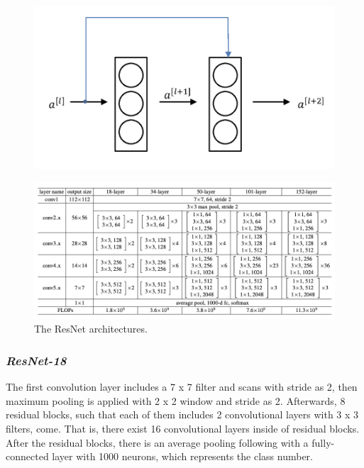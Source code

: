 \begin{figure}[h]
	\centering
	\includegraphics[width=.6\linewidth]{fig/residual_block.png}
	\label{fig:residual_block}
\end{figure}

\begin{figure}[h]
	\centering
	\includegraphics[width=\linewidth]{fig/resnet_archs.png}
	\vspace*{1mm}
	\caption{The ResNet architectures\cite{ResNet}.}
	\label{fig:resnet_archs}
\end{figure}

\subsubsection*{\textit{ResNet-18}}

The first convolution layer includes a 7 x 7 filter and scans with stride as 2, then maximum pooling is applied with 2 x 2 window and stride as 2. Afterwards, 8 residual blocks, such that each of them includes 2 convolutional layers with 3 x 3 filters, come. That is, there exist 16 convolutional layers inside of residual blocks. After the residual blocks, there is an average pooling following with a fully-connected layer with 1000 neurons, which represents the class number.

